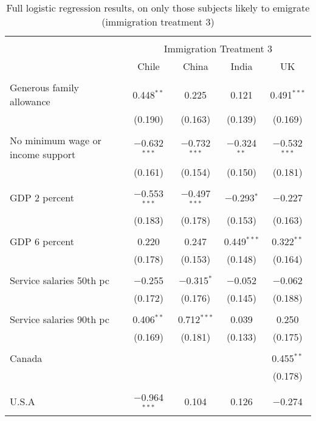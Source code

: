 
\begin{table}[!htbp] \centering 
  \caption{Full logistic regression results, on only those subjects likely to emigrate (immigration treatment 3)} 
  \label{} 
\begin{tabular}{@{\extracolsep{5pt}}lcccc} 
\\[-1.8ex]\hline 
\hline \\[-1.8ex] 
 & \multicolumn{4}{c}{Immigration Treatment 3} \\ 
\cline{2-5} 
 & Chile & China & India & UK \\ 
\hline \\[-1.8ex] 
 Generous family allowance & 0.448$^{**}$ & 0.225 & 0.121 & 0.491$^{***}$ \\ 
  & (0.190) & (0.163) & (0.139) & (0.169) \\ 
  & & & & \\ 
 No minimum wage or income support & $-$0.632$^{***}$ & $-$0.732$^{***}$ & $-$0.324$^{**}$ & $-$0.532$^{***}$ \\ 
  & (0.161) & (0.154) & (0.150) & (0.181) \\ 
  & & & & \\ 
 GDP 2 percent & $-$0.553$^{***}$ & $-$0.497$^{***}$ & $-$0.293$^{*}$ & $-$0.227 \\ 
  & (0.183) & (0.178) & (0.153) & (0.163) \\ 
  & & & & \\ 
 GDP 6 percent & 0.220 & 0.247 & 0.449$^{***}$ & 0.322$^{**}$ \\ 
  & (0.178) & (0.153) & (0.148) & (0.164) \\ 
  & & & & \\ 
 Service salaries 50th pc & $-$0.255 & $-$0.315$^{*}$ & $-$0.052 & $-$0.062 \\ 
  & (0.172) & (0.176) & (0.145) & (0.188) \\ 
  & & & & \\ 
 Service salaries 90th pc & 0.406$^{**}$ & 0.712$^{***}$ & 0.039 & 0.250 \\ 
  & (0.169) & (0.181) & (0.133) & (0.175) \\ 
  & & & & \\ 
 Canada &  &  &  & 0.455$^{**}$ \\ 
  &  &  &  & (0.178) \\ 
  & & & & \\ 
 U.S.A & $-$0.964$^{***}$ & 0.104 & 0.126 & $-$0.274 \\ 

\end{tabular}
\end{table}
